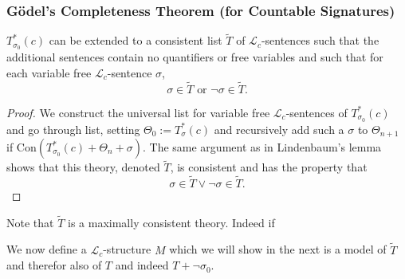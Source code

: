 \subsubsection{Gödel's Completeness Theorem (for Countable Signatures)}
\begin{lemma}
    $T^\ast_{\sigma_0}(c)$ can be extended to a consistent list $\widetilde{T}$ of $\mathcal{L}_c$-sentences such that the additional sentences contain no quantifiers or free variables and such that for each variable free $\mathcal{L}_c$-sentence $\sigma$,
    $$\sigma\in \widetilde{T} \text{ or } \neg\sigma\in \widetilde{T}.$$
\end{lemma}
\begin{proof}
    We construct the universal list for variable free $\mathcal{L}_c$-sentences of $T^\ast_{\sigma_0}(c)$ and go through list, setting $\Theta_0 := T^\ast_{\sigma}(c)$ and recursively add such a $\sigma$ to $\Theta_{n+1}$ if $\mathrm{Con}(T^\ast_{\sigma_0}(c)+\Theta_n+\sigma)$. The same argument as in Lindenbaum's lemma shows that this theory, denoted $\widetilde{T}$, is consistent and has the property that 
    $$
        \sigma \in \widetilde{T} \vee \neg \sigma\in \widetilde{T}.
    $$
\end{proof}
\begin{remark}
    Note that $\widetilde{T}$ is a maximally consistent theory. Indeed if 
\end{remark}
We now define a $\mathcal{L}_c$-structure $M$ which we will show in the next is a model of $\widetilde{T}$ and therefor also of $T$ and indeed $T+\neg \sigma_0$.

